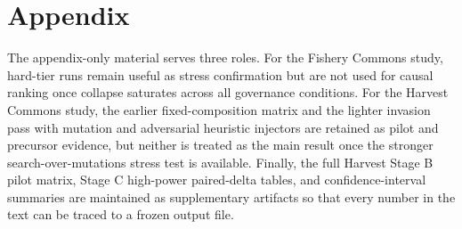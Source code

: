 \section{Appendix}
\small

The appendix-only material serves three roles. For the Fishery Commons study, hard-tier runs remain useful as stress confirmation but are not used for causal ranking once collapse saturates across all governance conditions. For the Harvest Commons study, the earlier fixed-composition matrix and the lighter invasion pass with mutation and adversarial heuristic injectors are retained as pilot and precursor evidence, but neither is treated as the main result once the stronger search-over-mutations stress test is available. Finally, the full Harvest Stage B pilot matrix, Stage C high-power paired-delta tables, and confidence-interval summaries are maintained as supplementary artifacts so that every number in the text can be traced to a frozen output file.
